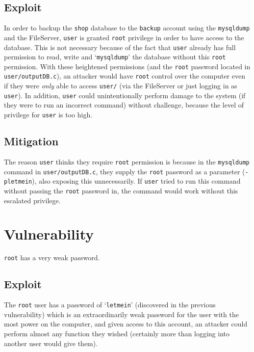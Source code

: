 \documentclass[11pt]{article}
\begin{document}
\subsection{Exploit}

In order to backup the \texttt{shop} database to the \texttt{backup} account using the \texttt{mysqldump} and the FileServer, \texttt{user} is granted \texttt{root} privilege in order to have access to the database. This is not necessary because of the fact that \texttt{user} already has full permission to read, write and `\texttt{mysqldump}' the database  without this \texttt{root} permission. With these heightened permissions (and the \texttt{root} password located in \texttt{user/outputDB.c}), an attacker would have \texttt{root} control over the computer even if they were \textit{only} able to access \texttt{user/} (via the FileServer or just logging in as \texttt{user}). In addition, \texttt{user} could unintentionally perform damage to the system (if they were to run an incorrect command) without challenge, because the level of privilege for \texttt{user} is too high.

\subsection{Mitigation}

The reason \texttt{user} thinks they require \texttt{root} permission is because in the \texttt{mysqldump} command in \texttt{user/outputDB.c}, they supply the \texttt{root} password as a parameter (\texttt{-pletmein}), also exposing this unnecessarily. If \texttt{user} tried to run this command without passing the \texttt{root} password in, the command would work without this escalated privilege.

\section{Vulnerability}

\texttt{root} has a very weak password.

\subsection{Exploit}

The \texttt{root} user has a password of `\texttt{letmein}' (discovered in the previous vulnerability) which is an extraordinarily weak password for the user with the most power on the computer, and given access to this account, an attacker could perform almost any function they wished (certainly more than logging into another user would give them).
\end{document}
